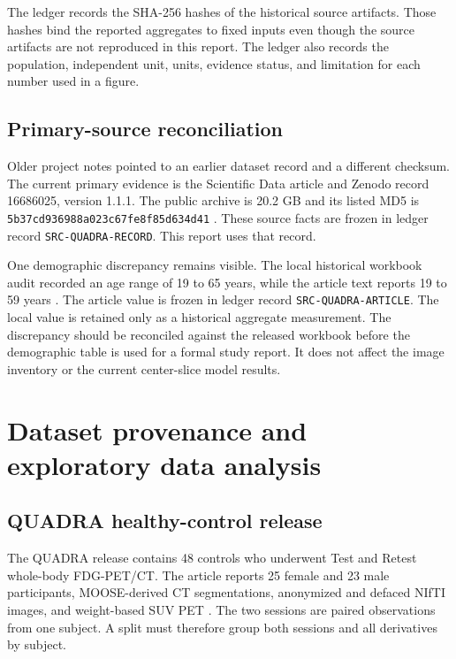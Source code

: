 \documentclass[11pt]{article}
\newcommand{\evidenceid}[1]{\texttt{#1}}
\begin{document}
The ledger records the SHA-256 hashes of the historical source artifacts. Those hashes bind the reported aggregates to fixed inputs even though the source artifacts are not reproduced in this report. The ledger also records the population, independent unit, units, evidence status, and limitation for each number used in a figure.

\subsection{Primary-source reconciliation}

Older project notes pointed to an earlier dataset record and a different checksum. The current primary evidence is the Scientific Data article and Zenodo record 16686025, version 1.1.1. The public archive is 20.2 GB and its listed MD5 is \texttt{5b37cd936988a023c67fe8f85d634d41} \citep{quadra2025,quadraZenodo}. These source facts are frozen in ledger record \evidenceid{SRC-QUADRA-RECORD}. This report uses that record.

One demographic discrepancy remains visible. The local historical workbook audit recorded an age range of 19 to 65 years, while the article text reports 19 to 59 years \citep{quadra2025}. The article value is frozen in ledger record \evidenceid{SRC-QUADRA-ARTICLE}. The local value is retained only as a historical aggregate measurement. The discrepancy should be reconciled against the released workbook before the demographic table is used for a formal study report. It does not affect the image inventory or the current center-slice model results.

\section{Dataset provenance and exploratory data analysis}

\subsection{QUADRA healthy-control release}

The QUADRA release contains 48 controls who underwent Test and Retest whole-body FDG-PET/CT. The article reports 25 female and 23 male participants, MOOSE-derived CT segmentations, anonymized and defaced NIfTI images, and weight-based SUV PET \citep{quadra2025}. The two sessions are paired observations from one subject. A split must therefore group both sessions and all derivatives by subject.
\end{document}
